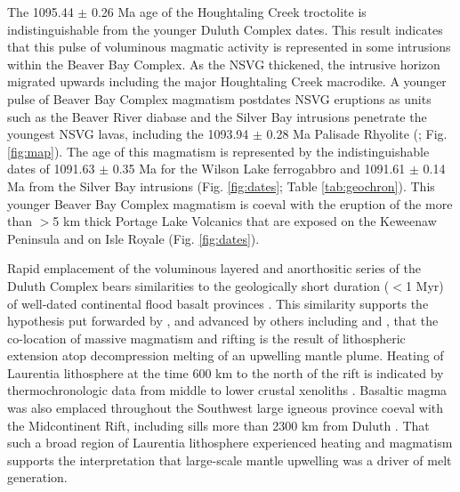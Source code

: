 \documentclass[11pt,letterpaper]{article}
\begin{document}
The 1095.44 $\pm$ 0.26 Ma age of the Houghtaling Creek troctolite is indistinguishable from the younger Duluth Complex dates. This result indicates that this pulse of voluminous magmatic activity is represented in some intrusions within the Beaver Bay Complex. As the NSVG thickened, the intrusive horizon migrated upwards including the major Houghtaling Creek macrodike. A younger pulse of Beaver Bay Complex magmatism postdates NSVG eruptions as units such as the Beaver River diabase and the Silver Bay intrusions penetrate the youngest NSVG lavas, including the 1093.94 $\pm$ 0.28 Ma Palisade Rhyolite (\citealp{Miller2001a, Swanson-Hysell2019a}; Fig. \ref{fig:map}). The age of this magmatism is represented by the indistinguishable dates of 1091.63 $\pm$ 0.35 Ma for the Wilson Lake ferrogabbro and 1091.61 $\pm$ 0.14 Ma from the Silver Bay intrusions (Fig. \ref{fig:dates}; Table \ref{tab:geochron}). This younger Beaver Bay Complex magmatism is coeval with the eruption of the more than $>$5 km thick Portage Lake Volcanics that are exposed on the Keweenaw Peninsula and on Isle Royale (Fig. \ref{fig:dates}).

Rapid emplacement of the voluminous layered and anorthositic series of the Duluth Complex bears similarities to the geologically short duration ($<$1 Myr) of well-dated continental flood basalt provinces \citep{Burgess2015a, Schoene2019a}. This similarity supports the hypothesis put forwarded by \cite{Green1983a}, and advanced by others including \cite{Cannon1992a} and \cite{Stein2015a}, that the co-location of massive magmatism and rifting is the result of lithospheric extension atop decompression melting of an upwelling mantle plume. Heating of Laurentia lithosphere at the time 600 km to the north of the rift is indicated by thermochronologic data from middle to lower crustal xenoliths \citep{Edwards2018a}. Basaltic magma was also emplaced throughout the Southwest large igneous province coeval with the Midcontinent Rift, including sills more than 2300 km from Duluth \citep{Bright2014a}. That such a broad region of Laurentia lithosphere experienced heating and magmatism supports the interpretation that large-scale mantle upwelling was a driver of melt generation.

\end{document}
